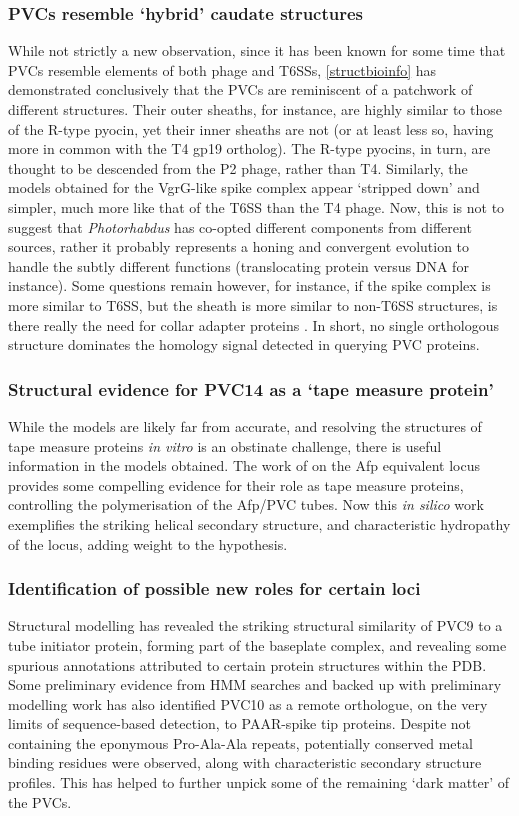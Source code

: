 \subsubsection{PVCs resemble `hybrid' caudate structures}
While not strictly a new observation, since it has been known for some time that PVCs resemble elements of both phage and T6SSs, \vref{structbioinfo} has demonstrated conclusively that the PVCs are reminiscent of a patchwork of different structures. Their outer sheaths, for instance, are highly similar to those of the R-type pyocin, yet their inner sheaths are not (or at least less so, having more in common with the T4 gp19 ortholog). The R-type pyocins, in turn, are thought to be descended from the P2 phage, rather than T4. Similarly, the models obtained for the VgrG-like spike complex appear `stripped down' and simpler, much more like that of the T6SS than the T4 phage. Now, this is not to suggest that \emph{Photorhabdus} has co-opted different components from different sources, rather it probably represents a honing and convergent evolution to handle the subtly different functions (translocating protein versus DNA for instance). Some questions remain however, for instance, if the spike complex is more similar to T6SS, but the sheath is more similar to non-T6SS structures, is there really the need for collar adapter proteins \citep{Renault2018}. In short, no single orthologous structure dominates the homology signal detected in querying PVC proteins.

\subsubsection{Structural evidence for PVC14 as a `tape measure protein'}
While the models are likely far from accurate, and resolving the structures of tape measure proteins \emph{in vitro} is an obstinate challenge, there is useful information in the models obtained. The work of \cite{Rybakova2015} on the Afp equivalent locus provides some compelling evidence for their role as tape measure proteins, controlling the polymerisation of the Afp/PVC tubes. Now this \emph{in silico} work exemplifies the striking helical secondary structure, and characteristic hydropathy of the locus, adding weight to the hypothesis.

\subsubsection{Identification of possible new roles for certain loci}
Structural modelling has revealed the striking structural similarity of PVC9 to a tube initiator protein, forming part of the baseplate complex, and revealing some spurious annotations attributed to certain protein structures within the PDB. Some preliminary evidence from HMM searches and backed up with preliminary modelling work has also identified PVC10 as a remote orthologue, on the very limits of sequence-based detection, to PAAR-spike tip proteins. Despite not containing the eponymous Pro-Ala-Ala repeats, potentially conserved metal binding residues were observed, along with characteristic secondary structure profiles. This has helped to further unpick some of the remaining `dark matter' of the PVCs.

